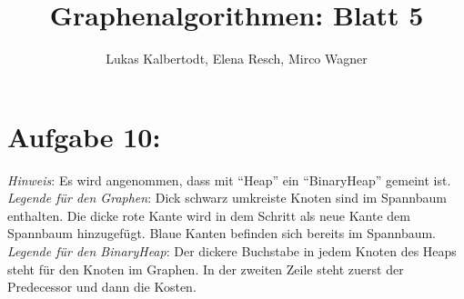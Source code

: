 \documentclass[11pt]{scrartcl} %
\title{Graphenalgorithmen: Blatt 5}
\author{Lukas Kalbertodt, Elena Resch, Mirco Wagner}
\begin{document}
\maketitle


\section*{Aufgabe 10:}
\emph{Hinweis}: Es wird angenommen, dass mit \enquote{Heap} ein \enquote{BinaryHeap} gemeint ist.\\[0.2cm]
\emph{Legende für den Graphen}: Dick schwarz umkreiste Knoten sind im Spannbaum enthalten. Die dicke rote Kante wird in dem Schritt als neue Kante dem Spannbaum hinzugefügt. Blaue Kanten befinden sich bereits im Spannbaum.\\[0.2cm]
\emph{Legende für den BinaryHeap}: Der dickere Buchstabe in jedem Knoten des Heaps steht für den Knoten im Graphen. In der zweiten Zeile steht zuerst der Predecessor und dann die Kosten.
\end{document}
